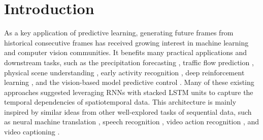 \documentclass[10pt,journal,compsoc]{IEEEtran}
\begin{document}
\maketitle


\IEEEdisplaynontitleabstractindextext




\IEEEpeerreviewmaketitle


























\section{Introduction}

As a key application of predictive learning, generating future frames from historical consecutive frames has received growing interest in machine learning and computer vision communities. 
It benefits many practical applications and downstream tasks, such as the precipitation forecasting \cite{shi2015convolutional,wang2017predrnn}, traffic flow prediction \cite{xu2018predcnn,wang2019memory}, physical scene understanding \cite{wu2017learning,van2018relational,kipf2018neural,xu2019unsupervised}, early activity recognition \cite{wang2019eidetic}, deep reinforcement learning \cite{ha2018recurrent,hafner2018learning}, and the vision-based model predictive control \cite{finn2017deep,ebert2017self}.
Many of these existing approaches suggested leveraging RNNs \cite{rumelhart1988learning,werbos1990backpropagation} with stacked LSTM units \cite{hochreiter1997long} to capture the temporal dependencies of spatiotemporal data.
This architecture is mainly inspired by similar ideas from other well-explored tasks of sequential data, such as neural machine translation \cite{Sutskever2011Generating,Cho2014On}, speech recognition \cite{Graves2014Towards}, video action recognition \cite{Ng15,donahue2015long}, and video captioning \cite{donahue2015long}.
\end{document}

